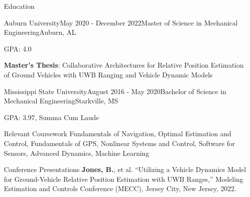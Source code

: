 \documentclass{resume} %
\begin{document}
\begin{rSection}{Education}

   \begin{rSubsection}{Auburn University}{May 2020 - December 2022}{Master of Science in Mechanical Engineering}{Auburn, AL}
  \item GPA: 4.0
  \item \textbf{Master's Thesis}: Collaborative Architectures for Relative Position Estimation of Ground Vehicles with UWB Ranging and Vehicle Dynamic Models
  \end{rSubsection}

 \begin{rSubsection}{Mississippi State University}{August 2016 - May 2020}{Bachelor of Science in Mechanical Engineering}{Starkville, MS}
  \item GPA: 3.97, Summa Cum Laude
  \end{rSubsection} 

\end{rSection}

\begin{rSection}{Relevant Coursework}
	Fundamentals of Navigation, Optimal Estimation and Control, Fundamentals of GPS, Nonlinear Systems and Control, Software for Sensors, Advanced Dynamics, Machine Learning

\end{rSection}

\begin{rSection}{Conference Presentations}
  \textbf{Jones, B.}, et al. ``Utilizing a Vehicle Dynamics Model for Ground-Vehicle Relative Position Estimation with UWB Ranges,'' Modeling Estimation and Controls Conference (MECC), Jersey City, New Jersey, 2022.
\end{rSection}
\end{document}
